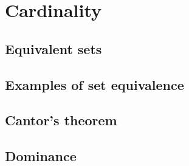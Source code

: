 \chapter{Cardinality}
\label{ch:card}


\section{Equivalent sets}
\label{sec:equiv_sets}




\newpage

\section{Examples of set equivalence}




\newpage

\section{Cantor's theorem}
\label{sec:cantors_thm}




\newpage

\section{Dominance}






%
 


